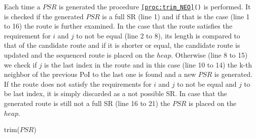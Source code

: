\pagebreak

Each time a $PSR$ is generated the procedure \texttt{\ref{proc:trim_NEO}()} is performed. It is checked if the generated $PSR$ is a full SR (line 1) and if that is the case (line 1 to 16) the route is further examined. In the case that the route satisfies the requirement for $i$ and $j$ to not be equal (line 2 to 8), its length is compared to that of the candidate route and if it is shorter or equal, the candidate route is updated and the sequenced route is placed on the $heap$. Otherwise (line 8 to 15) we check if $j$ is the last index in the route and in this case (line 10 to 14) the k-th neighbor of the previous PoI to the last one is found and a new $PSR$ is generated. If the route does not satisfy the requirements for $i$ and $j$ to not be equal and $j$ to be last index, it is simply discarded as a not possible SR. In case that the generated route is still not a full SR (line 16 to 21) the $PSR$ is placed on the $heap$. \newline

\begin{procedure}[H]
\caption{trim($PSR$)}
\label{proc:trim_NEO}
	
\end{procedure}

